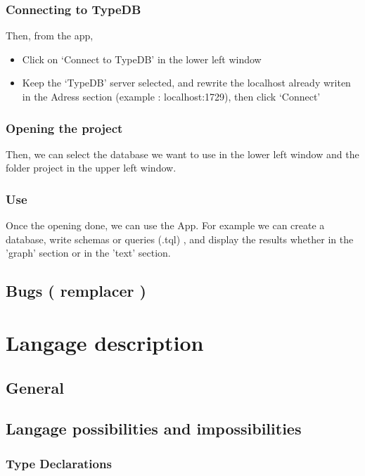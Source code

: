 \documentclass[runningheads]{llncs}
\begin{document}
\subsubsection{Connecting to TypeDB}
Then, from the app,
\begin{itemize}
\item Click on ‘Connect to TypeDB’ in the lower left window
\item Keep the ‘TypeDB’ server selected, and rewrite the localhost already writen in the Adress section (example : localhost:1729), then click ‘Connect’
\end{itemize}

\subsubsection{Opening the project}
Then, we can select the database we want to use in the lower left window and the folder project in the upper left window.

\subsubsection{Use}
    Once the opening done, we can use the App. For example we can create a database, write schemas or queries (.tql) , and display the results whether in the 'graph' section or in the 'text' section.
    






\subsection{Bugs ( remplacer ) }
    
    

\section{Langage description}

\subsection{General}


\subsection{Langage possibilities and impossibilities}

\subsubsection{Type Declarations}
\end{document}
